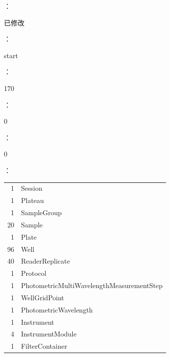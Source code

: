 \documentclass[UTF8,10pt,a4paper,fontset=fandol]{ctexart}
\newcommand{\fieldvalue}[1]{#1}
\begin{document}
：

\fieldvalue{已修改}

：

\fieldvalue{start}

：

\fieldvalue{170}

：

\fieldvalue{0}

：

\fieldvalue{0}

：

\begin{tabular}{r l}
\fieldvalue{1} & Session\\
\fieldvalue{1} & Plateau\\
\fieldvalue{1} & SampleGroup\\
\fieldvalue{20} & Sample\\
\fieldvalue{1} & Plate\\
\fieldvalue{96} & Well\\
\fieldvalue{40} & ReaderReplicate\\
\fieldvalue{1} & Protocol\\
\fieldvalue{1} & PhotometricMultiWavelengthMeasurementStep\\
\fieldvalue{1} & WellGridPoint\\
\fieldvalue{1} & PhotometricWavelength\\
\fieldvalue{1} & Instrument\\
\fieldvalue{4} & InstrumentModule\\
\fieldvalue{1} & FilterContainer
\end{tabular}
\end{document}
